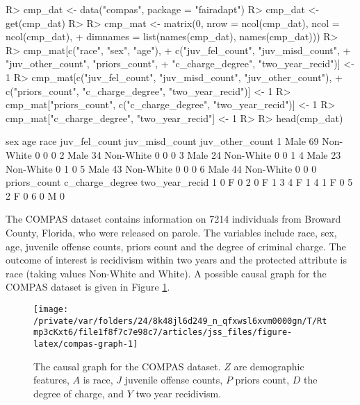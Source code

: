 \documentclass[
  nojss]{jss}
\begin{document}
\begin{CodeChunk}
\begin{CodeInput}
R> cmp_dat <- data("compas", package = "fairadapt")
R> cmp_dat <- get(cmp_dat)
R> 
R> cmp_mat <- matrix(0, nrow = ncol(cmp_dat), ncol = ncol(cmp_dat),
+                   dimnames = list(names(cmp_dat), names(cmp_dat)))
R> 
R> cmp_mat[c("race", "sex", "age"),
+         c("juv_fel_count", "juv_misd_count",
+           "juv_other_count", "priors_count",
+           "c_charge_degree", "two_year_recid")] <- 1
R> cmp_mat[c("juv_fel_count", "juv_misd_count", "juv_other_count"),
+         c("priors_count", "c_charge_degree", "two_year_recid")] <- 1
R> cmp_mat["priors_count", c("c_charge_degree", "two_year_recid")] <- 1
R> cmp_mat["c_charge_degree", "two_year_recid"] <- 1
R> 
R> head(cmp_dat)
\end{CodeInput}
\begin{CodeOutput}
   sex age      race juv_fel_count juv_misd_count juv_other_count
1 Male  69 Non-White             0              0               0
2 Male  34 Non-White             0              0               0
3 Male  24 Non-White             0              0               1
4 Male  23 Non-White             0              1               0
5 Male  43 Non-White             0              0               0
6 Male  44 Non-White             0              0               0
  priors_count c_charge_degree two_year_recid
1            0               F              0
2            0               F              1
3            4               F              1
4            1               F              0
5            2               F              0
6            0               M              0
\end{CodeOutput}
\end{CodeChunk}

The COMPAS dataset contains information on 7214 individuals from Broward
County, Florida, who were released on parole. The variables include
race, sex, age, juvenile offense counts, priors count and the degree of
criminal charge. The outcome of interest is recidivism within two years
and the protected attribute is race (taking values Non-White and White).
A possible causal graph for the COMPAS dataset is given in Figure
\ref{fig:compas-graph}.

\begin{CodeChunk}
\begin{figure}

{\centering \texttt{[image: /private/var/folders/24/8k48jl6d249\_n\_qfxwsl6xvm0000gn/T/Rtmp3cKxt6/file1f8f7c7e98c7/articles/jss\_files/figure-latex/compas-graph-1]} 

}

\caption[The causal graph for the COMPAS dataset]{The causal graph for the COMPAS dataset. $Z$ are demographic features, $A$ is race, $J$ juvenile offense counts, $P$ priors count, $D$ the degree of charge, and $Y$ two year recidivism.}\label{fig:compas-graph}
\end{figure}
\end{CodeChunk}
\end{document}
